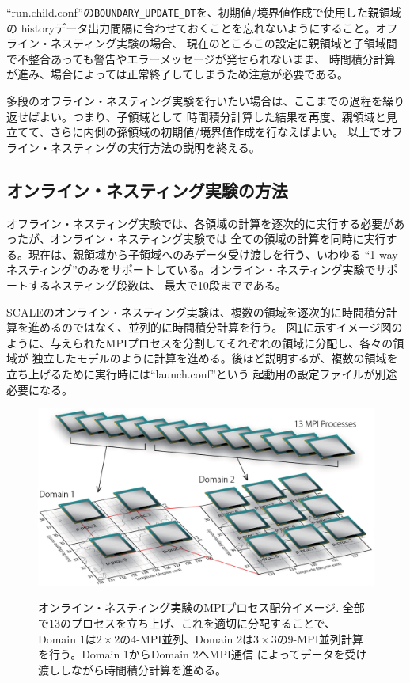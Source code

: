 \noindent ``run.child.conf''の\verb|BOUNDARY_UPDATE_DT|を、初期値/境界値作成で使用した親領域の
historyデータ出力間隔に合わせておくことを忘れないようにすること。オフライン・ネスティング実験の場合、
現在のところこの設定に親領域と子領域間で不整合あっても警告やエラーメッセージが発せられないまま、
時間積分計算が進み、場合によっては正常終了してしまうため注意が必要である。

多段のオフライン・ネスティング実験を行いたい場合は、ここまでの過程を繰り返せばよい。つまり、子領域として
時間積分計算した結果を再度、親領域と見立てて、さらに内側の孫領域の初期値/境界値作成を行なえばよい。
以上でオフライン・ネスティングの実行方法の説明を終える。


\subsection{オンライン・ネスティング実験の方法} \label{subsec:nest_online}

オフライン・ネスティング実験では、各領域の計算を逐次的に実行する必要があったが、オンライン・ネスティング実験では
全ての領域の計算を同時に実行する。現在は、親領域から子領域へのみデータ受け渡しを行う、いわゆる
``1-wayネスティング''のみをサポートしている。オンライン・ネスティング実験でサポートするネスティング段数は、
最大で10段までである。

SCALEのオンライン・ネスティング実験は、複数の領域を逐次的に時間積分計算を進めるのではなく、並列的に時間積分計算を行う。
図\ref{fig_mpisplit}に示すイメージ図のように、与えられたMPIプロセスを分割してそれぞれの領域に分配し、各々の領域が
独立したモデルのように計算を進める。後ほど説明するが、複数の領域を立ち上げるために実行時には``launch.conf''という
起動用の設定ファイルが別途必要になる。

\begin{figure}[t]
\begin{center}
  \includegraphics[width=0.8\hsize]{./figure/mpisplit_nesting.eps}\\
  \caption{オンライン・ネスティング実験のMPIプロセス配分イメージ. 全部で13のプロセスを立ち上げ、これを適切に分配することで、
           Domain 1は$2 \times 2$の4-MPI並列、Domain 2は$3 \times 3$の9-MPI並列計算を行う。Domain 1からDomain 2へMPI通信
           によってデータを受け渡ししながら時間積分計算を進める。}
  \label{fig_mpisplit}
\end{center}
\end{figure}


